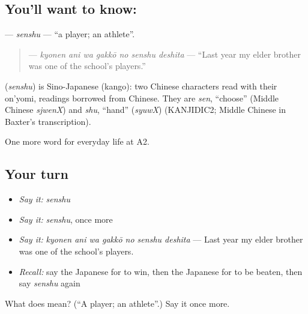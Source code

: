 \subsection*{You'll want to know: }
\textbf{} — \emph{senshu} — \textquotedblleft{}a player; an athlete\textquotedblright{}.

\begin{quote}
\textbf{   } — \emph{kyonen ani wa gakkō no senshu deshita} — \textquotedblleft{}Last year my elder brother was one of the school's players.\textquotedblright{}
\end{quote}

\begin{cousinweb}
\textbf{} (\emph{senshu}) is Sino-Japanese (kango): two Chinese characters read with their on'yomi, readings borrowed from Chinese. They are \emph{sen}, \textquotedblleft{}choose\textquotedblright{} (Middle Chinese \emph{sjwenX}) and \emph{shu}, \textquotedblleft{}hand\textquotedblright{} (\emph{syuwX}) (KANJIDIC2; Middle Chinese in Baxter's transcription).
\end{cousinweb}

\begin{grammarlens}[title={What you've built}]
One more word for everyday life at A2.
\end{grammarlens}

\subsection*{Your turn}
\begin{itemize}
\raggedright
  \item \emph{Say it:} \emph{senshu}
  \item \emph{Say it:} \emph{senshu}, once more
  \item \emph{Say it:} \emph{kyonen ani wa gakkō no senshu deshita} — Last year my elder brother was one of the school's players.
  \item \emph{Recall:} say the Japanese for to win, then the Japanese for to be beaten, then say \emph{senshu} again
\end{itemize}

\begin{tcolorbox}[breakable,colback=teal!4,colframe=teal!35!black,title={Before you move on}]
What does  mean? (\textquotedblleft{}A player; an athlete\textquotedblright{}.) Say it once more.
\end{tcolorbox}

